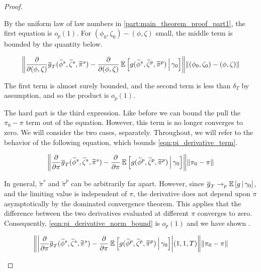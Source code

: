 \documentclass[11pt, letterpaper, twoside, final]{article}
\begin{document}
\begin{appendices}
\begin{proof}
\begin{proofpart}
    By the uniform law of law numbers in \cref{part:main_theorem_proof_part1}, the first equation is $o_p(1)$.
    For $(\phi_0, \zeta_0) - (\phi, \zeta)$ small, the middle term is bounded by the quantity below. 


    \begin{equation}
        \norm*{\frac{\partial}{\partial (\phi, \zeta)}\sampmom(\widetilde{\phi}^s, \widetilde{\zeta}^s,
        \widetilde{\pi}^s) -  \frac{\partial}{\partial (\phi, \zeta)} \E\left[\popmom(\widetilde{\phi}^s,
        \widetilde{\zeta}^p, \widetilde{\pi}^p)\mvert \gamma_0\right]} \norm*{(\phi_0, \zeta_0) - (\phi, \zeta)}
    \end{equation}

    The first term is almost surely bounded, and the second term is less than $\delta_T$ by assumption, and so the
    product is $o_p(1)$.

    The hard part is the third expression.
    Like before we can bound the pull the $\pi_0 - \pi$ term out of the equation.
    However, this term is no longer converges to zero.
    We will consider the two cases, separately.
    Throughout, we will refer to the behavior of the following equation, which bounds
    \cref{eqn:pi_derivative_term}.


    \begin{equation}
        \norm*{\frac{\partial}{\partial \pi}\sampmom(\widetilde{\phi}^s, \widetilde{\zeta}^s, \widetilde{\pi}^s) -
        \frac{\partial}{\partial \pi} \E\left[\popmom(\widetilde{\phi}^p, \widetilde{\zeta}^p,
        \widetilde{\pi}^p)\mvert \gamma_0\right] } \norm*{\pi_0 - \pi} 
        \label{eqn:pi_derivative_norm_bound}
    \end{equation}

    In general, $\tilde{\pi}^s$ and $\tilde{\pi}^p$ can be arbitrarily far apart.
    However, since $\overline{g}_T \to_p \operatorname{\mathbb{E}}\left[g \,\middle\vert\, \gamma_0\right]$, and the limiting value is independent of
    $\pi$, the derivative does not depend upon $\pi$ asymptotically by the dominated convergence theorem.
    This applies that the difference between the two derivatives evaluated at different $\pi$ converges to zero.
    Consequently, \cref{eqn:pi_derivative_norm_bound} is $o_p(1)$ and we have shown .

    \begin{equation}
        \norm*{\abs*{\frac{\partial}{\partial \pi}\sampmom(\widetilde{\phi}^s, \widetilde{\zeta}^s,
        \widetilde{\pi}^s) - \frac{\partial}{\partial \pi} \E\left[\popmom(\widetilde{\phi}^p,
        \widetilde{\zeta}^p, \widetilde{\pi}^p)\mvert \gamma_0\right]} (1, 1, T)} \norm*{\pi_0 - \pi} 
        \label{eqn:pi_derivative_rescaled_bound}
    \end{equation}


\end{proofpart}
\end{proof}
\end{appendices}
\end{document}
